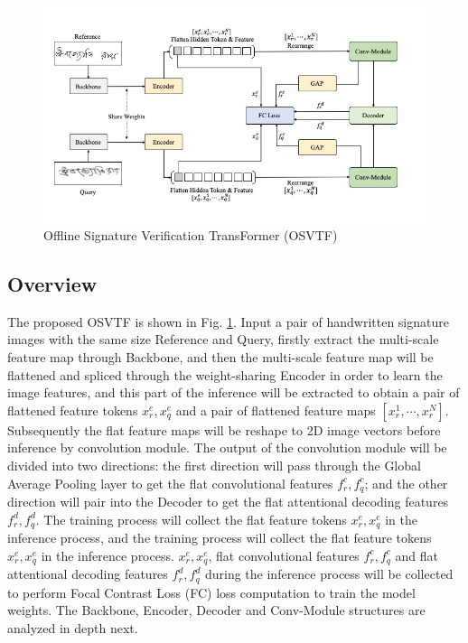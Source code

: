 \documentclass{article}
\begin{document}
\begin{figure}[htbp]
	\centering
	\includegraphics[scale=0.5]{figure/p1.jpg}
	\caption{Offline Signature Verification TransFormer (OSVTF)}\label{fig:p1}
\end{figure}

\subsection{Overview}

The proposed OSVTF is shown in Fig. \ref{fig:p1}. Input a pair of handwritten signature images with the same size Reference and Query, firstly extract the multi-scale feature map through Backbone, and then the multi-scale feature map will be flattened and spliced through the weight-sharing Encoder in order to learn the image features, and this part of the inference will be extracted to obtain a pair of flattened feature tokens $x_r^e, x_q^e$ and a pair of flattened feature maps $[x_r^1, \cdots, x_r^N]$. Subsequently the flat feature maps will be reshape to 2D image vectors before inference by convolution module. The output of the convolution module will be divided into two directions: the first direction will pass through the Global Average Pooling layer to get the flat convolutional features $f_r^c, f_q^c$; and the other direction will pair into the Decoder to get the flat attentional decoding features $f_r^d, f_q^d$. The training process will collect the flat feature tokens $x_r^e,x_q^e$ in the inference process, and the training process will collect the flat feature tokens $x_r^e,x_q^e$ in the inference process. $x_r^e,x_q^e$, flat convolutional features $f_r^c ,f_q^c$ and flat attentional decoding features $f_r^d,f_q^d$ during the inference process will be collected to perform Focal Contrast Loss (FC) loss computation to train the model weights. The Backbone, Encoder, Decoder and Conv-Module structures are analyzed in depth next.
\end{document}
